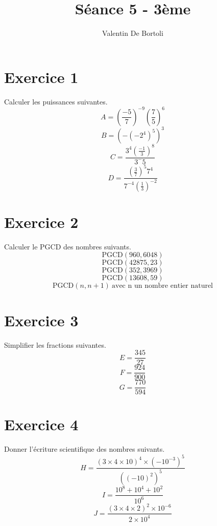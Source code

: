\documentclass[10pt,a4paper]{article}
\title{Séance 5 - 3ème}
\author{Valentin De Bortoli}
\begin{document}
\maketitle
\section{Exercice 1}
Calculer les puissances suivantes.
\begin{equation}
A=(\frac{-5}{7})^{-9}(\frac{7}{5})^6
\end{equation}
\begin{equation}
B=(-(-2^4)^5)^3
\end{equation}
\begin{equation}
C=\frac{3^4(\frac{-1}{3})^8}{3^-5}
\end{equation}
\begin{equation}
D=\frac{(\frac{3}{7})^5 7^4}{7^{-4}(\frac{1}{3})^{-2}}
\end{equation}
\section{Exercice 2}
Calculer le PGCD des nombres suivants.
\begin{equation}
\text{PGCD}(960,6048)
\end{equation}
\begin{equation}
\text{PGCD}(42875,23)
\end{equation}
\begin{equation}
\text{PGCD}(352,3969)
\end{equation}
\begin{equation}
\text{PGCD}(13608,59)
\end{equation}
\begin{equation}
\text{PGCD}(n,n+1) \ \text{avec n un nombre entier naturel}
\end{equation}
\section{Exercice 3}
Simplifier les fractions suivantes.
\begin{equation}
E=\frac{345}{27}
\end{equation}
\begin{equation}
F=\frac{924}{900}
\end{equation}
\begin{equation}
G=\frac{770}{594}
\end{equation}
\section{Exercice 4}
Donner l'écriture scientifique des nombres suivants.
\begin{equation}
H=\frac{(3\times 4 \times 10)^4 \times (-10^{-3})^5}{((-10)^2)^5}
\end{equation}
\begin{equation}
I=\frac{10^8+10^4+10^2}{10^6}
\end{equation}
\begin{equation}
J=\frac{(3 \times 4 \times 2)^2 \times 10^{-6}}{2 \times 10^4}
\end{equation}
\end{document}
